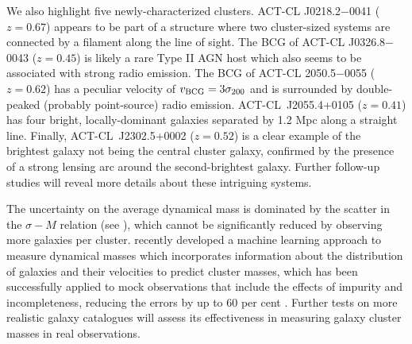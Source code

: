 We also highlight five newly-characterized clusters. ACT-CL J0218.2$-$0041 ($z=0.67$) appears to be part of a structure where two cluster-sized systems are connected by a filament along the line of sight. The BCG of ACT-CL J0326.8$-$0043 ($z=0.45$) is likely a rare Type II AGN host which also seems to be associated with strong radio emission. The BCG of ACT-CL 2050.5$-$0055 ($z=0.62$) has a peculiar velocity of $v_{\rm BCG}=3\sigma_{200}$ and is surrounded by double-peaked (probably point-source) radio emission. ACT-CL~J2055.4+0105 ($z=0.41$) has four bright, locally-dominant galaxies separated by 1.2 Mpc along a straight line. Finally, ACT-CL~J2302.5+0002 ($z=0.52$) is a clear example of the brightest galaxy not being the central cluster galaxy, confirmed by the presence of a strong lensing arc around the second-brightest galaxy. Further follow-up studies will reveal more details about these intriguing systems.

The uncertainty on the average dynamical mass is dominated by the scatter in the $\sigma-M$ relation (see ), which cannot be significantly reduced by observing more galaxies per cluster. \cite{ntampaka15} recently developed a machine learning approach to measure dynamical masses which incorporates information about the distribution of galaxies and their velocities to predict cluster masses, which has been successfully applied to mock observations that include the effects of impurity and incompleteness, reducing the errors by up to 60 per cent \citep{ntampaka16}. Further tests on more realistic galaxy catalogues will assess its effectiveness in measuring galaxy cluster masses in real observations.


